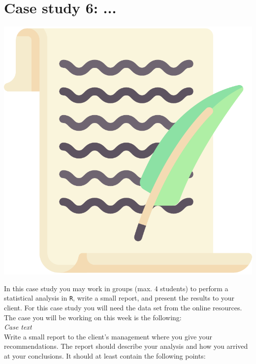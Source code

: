 
\begin{minipage}{0.8\textwidth}
\section{Case study 6: ...}
\end{minipage}%
\hfill%
\begin{minipage}{0.1\textwidth}
\includegraphics[width=\linewidth]{Files/Images/lettericon.pdf}
\end{minipage}
\vspace*{.1cm}

In this case study you may work in groups (max. 4 students) to perform a statistical analysis in \texttt{R}, write a small report, and present the results to your client. For this case study you will need the data set  from the online resources. The case you will be working on this week is the following: \\

\textit{Case text} \\

Write a small report to the client's management where you give your recommendations. The report should describe your analysis and how you arrived at your conclusions. It should at least contain the following points: \\

